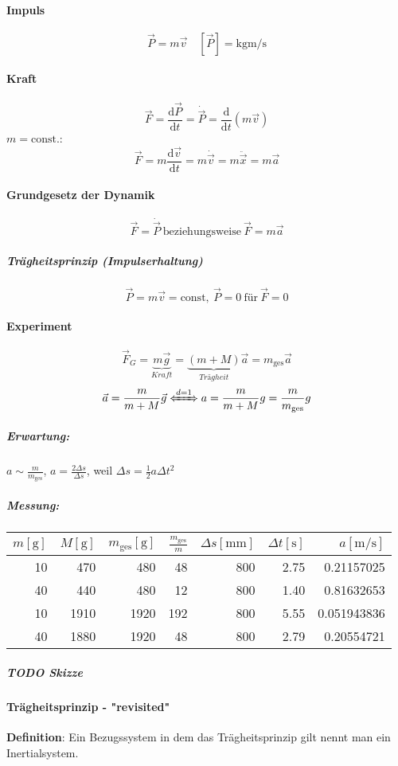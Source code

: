 \documentclass[a4paper]{scrartcl}
\renewcommand{\d}{\mathrm{d}}
\newcommand{\f}[2]{{\frac{#1}{#2}}}
\renewcommand{\v}[1]{\vec{#1}}
\theoremstyle{definition}
\theoremstyle{plain}
\theoremstyle{plain}
\theoremstyle{remark}
\theoremstyle{remark}
\theoremstyle{remark}
\begin{document}
\paragraph{Impuls}
\label{sec-2-2-1-1}
\[\v P = m\v v\quad [\v P] = \si{\kg\meter\per\second}\]
\paragraph{Kraft}
\label{sec-2-2-1-2}
\[\v F = \f{\d\v P}{\d t} = \dot{\v P} = \f{\d}{\d t}(m\v v)\]
$m = \text{const.}$:
\[\v F = m \f{\d\v v}{\d t} = m\dot{\v v} = m\ddot{\v x} = m\v a\]
\paragraph{Grundgesetz der Dynamik}
\label{sec-2-2-1-3}
\[\v F = \dot{\v P}~\text{beziehungsweise}~\v F = m\v a\]
\subparagraph{Trägheitsprinzip (Impulserhaltung)}
\label{sec-2-2-1-3-1}
\[\v P = m\v v = \text{const},~\v P = 0~\text{für}~\v F = 0\]
\paragraph{Experiment}
\label{sec-2-2-1-4}
\[\v F_G = \underbrace{m\v g}_{Kraft} = \underbrace{(m + M)}_{Trägheit}\v a = m_{\text{ges}}\v a\]
\[\v a = \f{m}{m + M}\v g \xLeftrightarrow{d = 1} a = \f{m}{m + M}g = \f{m}{m_{\text{ges}}}g\]
\subparagraph{Erwartung:}
\label{sec-2-2-1-4-1}
$a\sim {\f{m}{m_{\text{ges}}}}$, $a = \f{2\Delta s}{\Delta s}$, weil $\Delta s = \f{1}{2} a\Delta t^2$
\subparagraph{Messung:}
\label{sec-2-2-1-4-2}
\begin{center}
\begin{tabular}{rrrrrrr}
$m[\si{\gram}]$ & $M[\si{\gram}]$ & $m_{\text{ges}}[\si{\gram}]$ & $\f{m_{\text{ges}}}{m}$ & $\Delta s[\si{\mm}]$ & $\Delta t [\si{\second}]$ & $a[\si{\meter\per\second}]$\\
\hline
10 & 470 & 480 & 48 & 800 & 2.75 & 0.21157025\\
40 & 440 & 480 & 12 & 800 & 1.40 & 0.81632653\\
10 & 1910 & 1920 & 192 & 800 & 5.55 & 0.051943836\\
40 & 1880 & 1920 & 48 & 800 & 2.79 & 0.20554721\\
\end{tabular}
\end{center}
\subparagraph{{\bfseries\sffamily TODO} Skizze}
\label{sec-2-2-1-4-3}
\paragraph{Trägheitsprinzip - "revisited"}
\label{sec-2-2-1-5}
\textbf{Definition}: Ein Bezugssystem in dem das Trägheitsprinzip gilt nennt man ein Inertialsystem. \\
\end{document}
